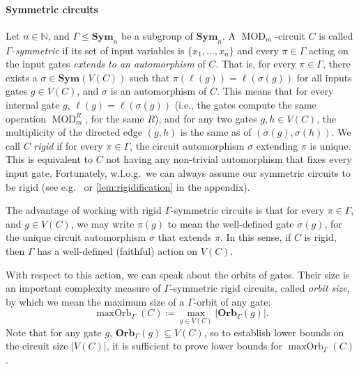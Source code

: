 \documentclass[11pt]{article}
\DeclareMathOperator{\MOD}{MOD}
\newcommand{\Sym}{\mathbf{Sym}}
\newcommand{\Orb}{\mathbf{Orb}}
\newcommand{\bbN}{\mathbb{N}}
\theoremstyle{definition}
\theoremstyle{plain}
\theoremstyle{remark}
\theoremstyle{remark}
\newcommand{\maxorb}{\operatorname{maxOrb}}
\begin{document}
\paragraph*{Symmetric circuits}
Let $n \in \bbN$, and $\Gamma \leq \Sym_n$ be a subgroup of $\Sym_n$.
A $\MOD_m$-circuit $C$ is called \emph{$\Gamma$-symmetric} if its set of input variables is $\{x_1, \dots, x_n\}$ and every $\pi \in \Gamma$ acting on the input gates \emph{extends to an automorphism} of $C$. That is, for every $\pi \in \Gamma$, there exists a $\sigma \in \Sym(V(C))$ such that $\pi(\ell(g)) = \ell(\sigma(g))$ for all inputs gates $g \in V(C)$, and $\sigma$ is an automorphism of $C$. This means that for every internal gate $g$, $\ell(g) = \ell(\sigma(g))$ (i.e., the gates compute the same operation $\MOD_m^R$, for the same $R$), and for any two gates $g,h \in V(C)$, the multiplicity of the directed edge $(g,h)$ is the same as of $(\sigma(g), \sigma(h))$.
We call $C$ \emph{rigid} if for every $\pi \in \Gamma$, the circuit automorphism $\sigma$ extending $\pi$ is unique. This is equivalent to $C$ not having any non-trivial automorphism that fixes every input gate.
Fortunately, w.l.o.g.\ we can always assume our symmetric circuits to be rigid (see e.g.\ \cite[Lemma 4.3]{arxivVersionSymAlgebraicCircuits} or \cref{lem:rigidification} in the appendix).

The advantage of working with rigid $\Gamma$-symmetric circuits is that for every $\pi \in \Gamma$, and $g \in V(C)$, we may write $\pi(g)$ to mean the well-defined gate $\sigma(g)$, for the unique circuit automorphism $\sigma$ that extends $\pi$. In this sense, if $C$ is rigid, then $\Gamma$ has a well-defined (faithful) action on $V(C)$. 

With respect to this action, we can speak about the orbits of gates. 
Their size is an important complexity measure of $\Gamma$-symmetric rigid circuits, called \emph{orbit size}, by which we mean the maximum size of a $\Gamma$-orbit of any gate:
\[
\maxorb_\Gamma(C) \coloneqq \max_{g \in V(C)} | \Orb_\Gamma(g) |.
\]
Note that for any gate $g$, $\Orb_\Gamma(g) \subseteq V(C)$, so to establish lower bounds on the circuit size $|V(C)|$, it is sufficient to prove lower bounds for $\maxorb_\Gamma(C)$.
\end{document}
